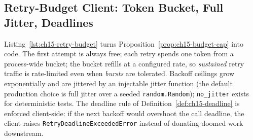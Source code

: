 \subsection{Retry-Budget Client: Token Bucket, Full Jitter, Deadlines}
\label{subsec:ch15-code-retry}

Listing~\ref{lst:ch15-retry-budget} turns
Proposition~\ref{prop:ch15-budget-cap} into code. The first attempt is
always free; each retry spends one token from a process-wide bucket; the
bucket refills at a configured rate, so \emph{sustained} retry traffic is
rate-limited even when \emph{bursts} are tolerated. Backoff ceilings grow
exponentially and are jittered by an injectable jitter function (the default
production choice is full jitter over a seeded \texttt{random.Random});
\texttt{no\_jitter} exists for deterministic tests. The deadline rule of
Definition~\ref{def:ch15-deadline} is enforced client-side: if the next
backoff would overshoot the call deadline, the client raises
\texttt{RetryDeadlineExceededError} instead of donating doomed work
downstream.

